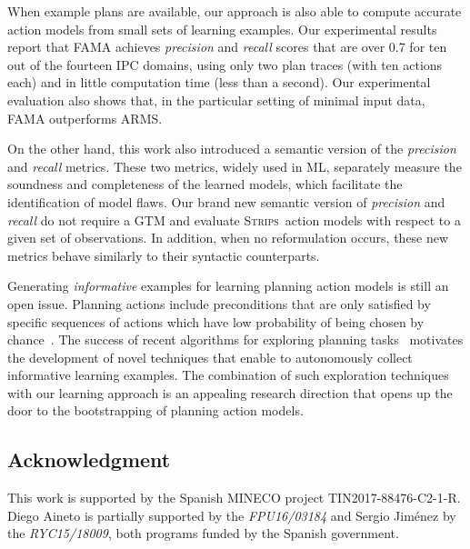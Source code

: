 \documentclass[3p,times]{elsarticle}
\newcommand{\strips}{\textsc{Strips}}     %
\newcommand{\ARMS}{{\small {\sffamily ARMS}}\xspace}
\newcommand{\FAMA}{{\small {\sffamily FAMA}}\xspace}
\begin{document}
When example plans are available, our approach is also able to compute accurate action models from small sets of learning examples. Our experimental results report that \FAMA achieves {\em precision} and {\em recall} scores that are over 0.7 for ten out of the fourteen IPC domains, using only two plan traces (with ten actions each) and in little computation time (less than a second). Our experimental evaluation also shows that, in the particular setting of minimal input data, \FAMA outperforms \ARMS.

On the other hand, this work also introduced a semantic version of the {\em precision} and {\em recall} metrics. These two metrics, widely used in ML, separately measure the soundness and completeness of the learned models, which facilitate the identification of model flaws. Our brand new semantic version of {\em precision} and {\em recall} do not require a GTM and evaluate \strips\ action models with respect to a given set of observations. In addition, when no reformulation occurs, these new metrics behave similarly to their syntactic counterparts. 

Generating {\em informative} examples for learning planning action models is still an open issue. Planning actions include preconditions that are only satisfied by specific sequences of actions which have low probability of being chosen by chance~\cite{fern2004learning}. The success of recent algorithms for exploring planning tasks~\cite{FrancesRLG17} motivates the development of novel techniques that enable to autonomously collect informative learning examples. The combination of such exploration techniques with our learning approach is an appealing research direction that opens up the door to the bootstrapping of planning action models.


\subsection*{Acknowledgment}
This work is supported by the Spanish MINECO project TIN2017-88476-C2-1-R. Diego Aineto is partially supported by the {\it FPU16/03184} and Sergio Jim\'enez by the {\it RYC15/18009}, both programs funded by the Spanish government.
\end{document}
